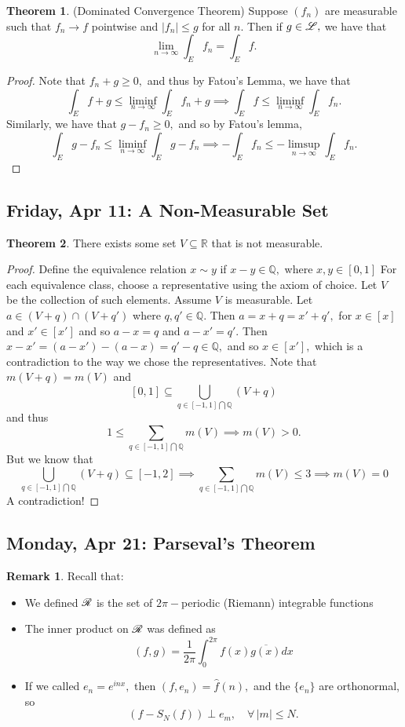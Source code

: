 \documentclass[10pt, oneside]{article}
\newcommand{\bbR}{\mathbb{R}}
\newcommand{\bbQ}{\mathbb{Q}}
\theoremstyle{definition}
\newtheorem{thm}{Theorem}
\newtheorem{rem}{Remark}
\begin{document}
 \begin{thm}
     (Dominated Convergence Theorem) Suppose $(f_n)$ are measurable such that $f_n \to f$ pointwise and $|f_n| \leq g$ for all $n.$ Then if $g \in \cal L,$ we have that 
     \[\lim_{n\to \infty }\int_E f_n = \int_E f.\]
 \end{thm}
 \begin{proof}
     Note that $f_n + g \geq 0,$ and thus by Fatou's Lemma, we have that 
     \[\int_E f + g \leq \liminf_{n\to \infty}\int_E f_n + g \implies \int_E f \leq \liminf_{n\to \infty} \int_E f_n.\] Similarly, we have that $g - f_n \geq 0,$ and so by Fatou's lemma, 
     \[\int_E g - f_n \leq \liminf_{n\to \infty} \int_E g - f_n \implies -\int_Ef_n \leq -\limsup_{n\to \infty} \int_E f_n.\]
 \end{proof}

\newpage
\subsection*{Friday, Apr 11: A Non-Measurable Set}
\begin{thm}
    There exists some set $V \subseteq \bbR$ that is not measurable.
\end{thm}
\begin{proof}
Define the equivalence relation $x\sim y$ if $x - y \in \bbQ,$ where $x,y \in [0,1]$ For each equivalence class, choose a representative using the axiom of choice. Let $V$ be the collection of such elements. Assume $V$ is measurable. Let $a\in (V + q) \cap (V + q')$ where $q, q' \in \bbQ.$ Then $a = x + q = x' + q',$ for $x \in [x]$ and $x' \in [x']$ and so $a - x = q$ and $a - x' = q'.$ Then $x - x' = (a-x') - (a-x) = q' -q \in \bbQ,$ and so $x \in [x'],$ which is a contradiction to the way we chose the representatives. Note that $m(V + q) = m(V)$ and 
\[[0,1] \subseteq \bigcup_{q\in [-1,1]\bigcap \bbQ} (V + q)\] and thus 
\[1 \leq \sum_{q\in [-1,1]\bigcap \bbQ} m(V) \implies m(V) >0.\] But we know that 
\[\bigcup_{q\in [-1,1]\bigcap \bbQ} (V + q)\subseteq [-1,2] \implies \sum_{q\in [-1,1]\bigcap \bbQ} m(V) \leq 3 \implies m(V) = 0\]
A contradiction!
    
\end{proof}



\newpage
\subsection{Monday, Apr 21: Parseval's Theorem}
\begin{rem}
    Recall that:
\begin{itemize}
    \item We defined $\cal R$ is the set of $2\pi-$periodic (Riemann) integrable functions
    \item The inner product on $\cal R$ was defined as 
    \[(f,g)= \frac{1}{2\pi}\int_0^{2\pi} f(x)\overline{g(x)}dx\]
    \item If we called $e_n = e^{inx},$ then $(f,e_n) = \hat{f}(n),$ and the $\{e_n\}$ are orthonormal, so 
    \[(f - S_N(f)) \perp e_m, \quad \forall\, |m| \leq N.\]
\end{itemize}
\end{rem}
\end{document}
